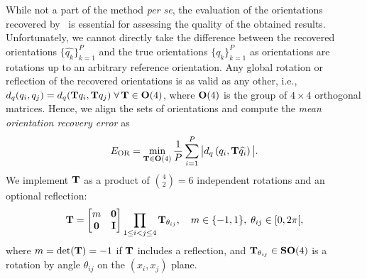 While not a part of the method \textit{per se}, the evaluation of the orientations recovered by~ is essential for assessing the quality of the obtained results.
Unfortunately, we cannot directly take the difference between the recovered orientations $\{\widehat{q_k}\}_{k=1}^P$ and the true orientations $\{q_k\}_{k=1}^P$ as orientations are rotations up to an arbitrary reference orientation.
Any global rotation or reflection of the recovered orientations is as valid as any other, i.e., $d_q(q_i, q_j) = d_q(\mathbf{T} q_i , \mathbf{T} q_j) \; \forall \, \mathbf{T} \in \mathrm{\mathbf{O}}(4)$, where $\mathrm{\mathbf{O}}(4)$ is the group of $4 \times 4$ orthogonal matrices. %
Hence, we align the sets of orientations and compute the \textit{mean orientation recovery error} as
\begin{equation}
    E_\text{OR} = \min_{\mathbf{T} \in \mathrm{\mathbf{O}}(4)} \frac{1}{P} \sum_{i=1}^P \big| d_q\left( q_i, \mathbf{T} \widehat{q_i} \right) \big|.
    \label{eqn:orientation-recovery-error}
\end{equation}
We implement $\mathbf{T}$ as a product of $\binom{4}{2}=6$ independent rotations and an optional reflection:
\begin{equation*}
    \mathbf{T} =
    \begin{bmatrix}
        m & \mathbf{0} \\
        \mathbf{0} & \mathbf{I} \\
    \end{bmatrix}
    \prod_{1 \leq i < j \leq 4} \mathbf{T}_{\theta_{ij}},
    \quad m \in \{-1,1\}, \; \theta_{ij} \in [0, 2\pi[,
\end{equation*}
where $m = \det(\mathbf{T}) = -1$ if $\mathbf{T}$ includes a reflection, and $\mathbf{T}_{\theta_{ij}} \in \mathrm{\mathbf{SO}}(4)$ is a rotation by angle $\theta_{ij}$ on the $(x_i, x_j)$ plane.

